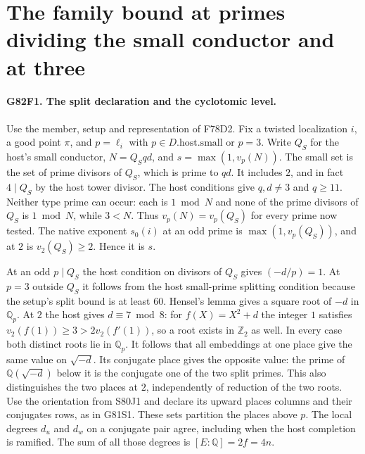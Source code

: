 \section{The family bound at primes dividing the small conductor and at three}

\paragraph{G82F1. The split declaration and the cyclotomic level.}
Use the member, setup and representation of F78D2. Fix a twisted
localization $i$, a good point $\pi$, and $p=\ell_i$ with
$p\in D.\mathrm{host.small}$ or $p=3$. Write $Q_S$ for the
host's small conductor, $N=Q_S qd$, and
$s=\max(1,v_p(N))$. The small set is the set of prime divisors
of $Q_S$, which is prime to $qd$. It includes $2$, and in fact
$4\mid Q_S$ by the host tower divisor. The host conditions give
$q,d\ne3$ and $q\ge11$. Neither type prime can occur: each is
$1\bmod N$ and none of the prime divisors of $Q_S$ is $1\bmod N$,
while $3<N$. Thus $v_p(N)=v_p(Q_S)$ for every prime now tested.
The native exponent $s_0(i)$ at an odd prime is
$\max(1,v_p(Q_S))$, and at $2$ is $v_2(Q_S)\ge2$. Hence it is $s$.

At an odd $p\mid Q_S$ the host condition on divisors of $Q_S$
gives $(-d/p)=1$. At $p=3$ outside $Q_S$ it follows from the
host small-prime splitting condition because the setup's split
bound is at least $60$. Hensel's lemma gives a square root of
$-d$ in $\mathbb Q_p$. At $2$ the host gives $d\equiv7\bmod8$:
for $f(X)=X^2+d$ the integer $1$ satisfies
$v_2(f(1))\ge3>2v_2(f'(1))$, so a root exists in $\mathbb Z_2$
as well. In every case both distinct roots lie in $\mathbb Q_p$.
It follows that all embeddings at one place give the same value
on $\sqrt{-d}$. Its conjugate place gives the opposite value:
the prime of $\mathbb Q(\sqrt{-d})$ below it is the conjugate
one of the two split primes. This also distinguishes the two
places at $2$, independently of reduction of the two roots.
Use the orientation from S80J1 and declare its upward places
columns and their conjugates rows, as in G81S1. These sets
partition the places above $p$. The local degrees $d_u$ and $d_w$
on a conjugate pair agree, including when the host completion is
ramified. The sum of all those degrees is $[E:\mathbb Q]=2f=4n$.

